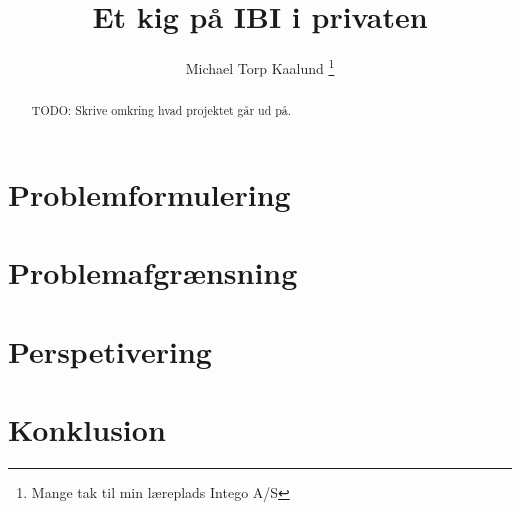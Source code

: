 \documentclass[12pt,a4paper,twoside]{article}
\title{Et kig på IBI i privaten}
\author{Michael Torp Kaalund \thanks{Mange tak til min læreplads Intego A/S}}
\begin{document}
    

    \begin{abstract}
        TODO: Skrive omkring hvad projektet går ud på.
    \end{abstract}

    \newpage

    \tableofcontents

    \newpage

    \section{Problemformulering}

    \section{Problemafgrænsning}

    \section{Perspetivering}

    \section{Konklusion}


    \appendix

    
    
    

    
\end{document}
